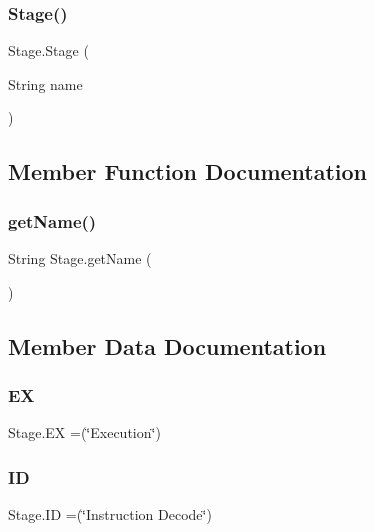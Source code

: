 \subsubsection{\texorpdfstring{Stage()}{Stage()}}
{\footnotesize\ttfamily Stage.\+Stage (\begin{DoxyParamCaption}\item[{String}]{name }\end{DoxyParamCaption})}



\subsection{Member Function Documentation}
\mbox{\label{enum_stage_aed7fc998a53b35079ed2ff1aef363ec5}} 
\subsubsection{\texorpdfstring{get\+Name()}{getName()}}
{\footnotesize\ttfamily String Stage.\+get\+Name (\begin{DoxyParamCaption}{ }\end{DoxyParamCaption})}



\subsection{Member Data Documentation}
\mbox{\label{enum_stage_aeda45a1236f43fc0e106bb52ea327611}} 
\subsubsection{\texorpdfstring{EX}{EX}}
{\footnotesize\ttfamily Stage.\+EX =(\char`\"{}Execution\char`\"{})}

\mbox{\label{enum_stage_a90caf5b774c79ea44ca5633fd8206453}} 
\subsubsection{\texorpdfstring{ID}{ID}}
{\footnotesize\ttfamily Stage.\+ID =(\char`\"{}Instruction Decode\char`\"{})}

